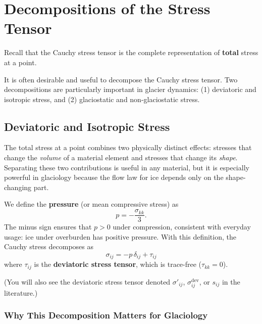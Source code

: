 \documentclass[11pt]{article}
\begin{document}
\section{Decompositions of the Stress Tensor}
\label{sec:decompositions}

Recall that the Cauchy stress tensor is the complete representation of \textbf{total} stress at a point.

It is often desirable and useful to decompose the Cauchy stress tensor.  Two decompositions are particularly important in glacier dynamics: (1) deviatoric and isotropic stress, and (2) glaciostatic and non-glaciostatic stress.

\subsection{Deviatoric and Isotropic Stress}

The total stress at a point combines two physically distinct effects: stresses that change the \emph{volume} of a material element and stresses that change its \emph{shape}.  Separating these two contributions is useful in any material, but it is especially powerful in glaciology because the flow law for ice depends only on the shape-changing part.

We define the \textbf{pressure} (or mean compressive stress) as
\begin{equation}
  p = -\frac{\sigma_{kk}}{3}.
\end{equation}
The minus sign ensures that $p > 0$ under compression, consistent with everyday usage: ice under overburden has positive pressure.  With this definition, the Cauchy stress decomposes as
\begin{equation}
  \boxed{\sigma_{ij} = -p\,\delta_{ij} + \tau_{ij}}
\end{equation}
where $\tau_{ij}$ is the \textbf{deviatoric stress tensor}, which is trace-free ($\tau_{kk} = 0$).

(You will also see the deviatoric stress tensor denoted $\sigma'_{ij}$, $\sigma_{ij}^{\text{dev}}$, or $s_{ij}$ in the literature.)

\subsubsection*{Why This Decomposition Matters for Glaciology}
\end{document}
